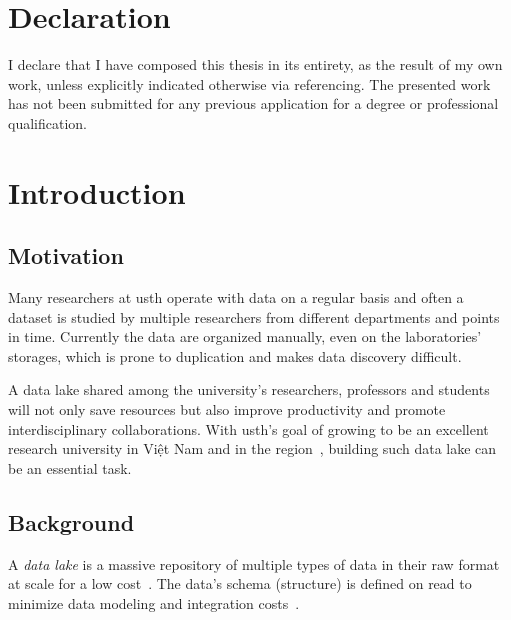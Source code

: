 \documentclass[a4paper,oneside,12pt]{book}
\begin{document}
\setcounter{page}{1}
\pagestyle{plain}
\tableofcontents

\chapter{Declaration}
I declare that I have composed this thesis in its entirety, as the result
of my own work, unless explicitly indicated otherwise via referencing.
The presented work has not been submitted for any previous application
for a degree or professional qualification.


\mainmatter
\pagestyle{headings}
\chapter{Introduction}
\section{Motivation}
Many researchers at \gls{usth} operate with data on a regular basis
and often a dataset is studied by multiple researchers from different
departments and points in time.  Currently the data are organized manually,
even on the laboratories' storages, which is prone to duplication
and makes data discovery difficult.

A data lake shared among the university's researchers, professors and students
will not only save resources but also improve productivity and promote
interdisciplinary collaborations.  With \gls{usth}'s goal of growing to be
an excellent research university in {Việt Nam}
and in the region~\cite{usth}, building such data lake can be an essential task.

\section{Background}
A \emph{data lake} is a massive repository of multiple types of data
in their raw format at scale for a low cost~\cite{lake}.
The data's schema (structure) is defined on read to minimize data modeling
and integration costs~\cite{lake}.
\end{document}
